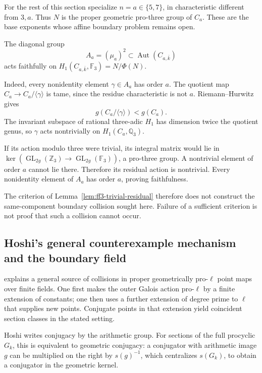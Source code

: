 For the rest of this section specialize \(n=a\in\{5,7\}\), in
characteristic different from \(3,a\). Thus \(N\) is the proper
geometric pro-three group of \(C_a\). These are the
base exponents whose affine boundary problem remains open.


The diagonal group \[
 A_a=(\mu_a)^2\subset\operatorname{Aut}(C_{a,\bar k})
\] acts faithfully on \(H_1(C_{a,\bar k},\mathbb F_3)=N/\Phi(N)\).

Indeed, every nonidentity element \(\gamma\in A_a\) has order \(a\). The quotient map \(C_a\to C_a/\langle\gamma\rangle\) is tame, since the residue characteristic is not \(a\). Riemann--Hurwitz gives \[
 g(C_a/\langle\gamma\rangle)<g(C_a).
\] The invariant subspace of rational three-adic \(H_1\) has dimension twice the quotient genus, so \(\gamma\) acts nontrivially on \(H_1(C_a,\mathbb Q_3)\).

If its action modulo three were trivial, its integral matrix would lie in \(\ker(\operatorname{GL}_{2g}(\mathbb Z_3)\to
       \operatorname{GL}_{2g}(\mathbb F_3))\), a pro-three group. A nontrivial element of order \(a\) cannot lie there. Therefore its residual action is nontrivial. Every nonidentity element of \(A_a\) has order \(a\), proving faithfulness.

The criterion of Lemma~\ref{lem:ff3-trivial-residual} therefore does not construct the same-component boundary collision sought here. Failure of a sufficient criterion is not proof that such a collision cannot occur.

\subsection{Hoshi’s general counterexample mechanism and the boundary field}
\label{subsec:ff3-hoshi}

\citet[Remark~10(i), pp.~742--743]{FCHoshi2009} explains a general source of collisions in proper geometrically pro-\(\ell\) point maps over finite fields. One first makes the outer Galois action pro-\(\ell\) by a finite extension of constants; one then uses a further extension of degree prime to \(\ell\) that supplies new points. Conjugate points in that extension yield coincident section classes in the stated setting.

Hoshi writes conjugacy by the arithmetic group. For sections of the full procyclic \(G_k\), this is equivalent to geometric conjugacy: a conjugator with arithmetic image \(g\) can be multiplied on the right by \(s(g)^{-1}\), which centralizes \(s(G_k)\), to obtain a conjugator in the geometric kernel.

